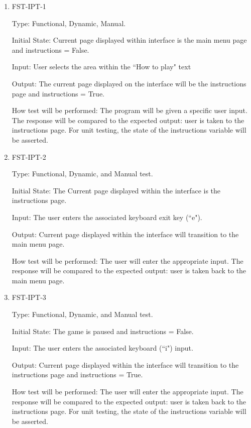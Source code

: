 \documentclass[12pt, titlepage]{article}
\begin{document}
\begin{enumerate}

\item{FST-IPT-1\\}

Type: Functional, Dynamic, Manual.
					
Initial State: Current page displayed within interface is the main menu page and instructions = False.
					
Input: User selects the area within the ``How to play" text
					
Output: The current page displayed on the interface will be the instructions page and instructions = True.
					
How test will be performed: The program will be given a specific user input. The response will be compared to the expected output: user is taken to the instructions page. For unit testing, the state of the instructions variable will be asserted.
					
\item{FST-IPT-2\\}

Type: Functional, Dynamic, and Manual test.
					
Initial State: The Current page displayed within the interface is the instructions page.
					
Input: The user enters the associated keyboard exit key (``e").
					
Output: Current page displayed within the interface will transition to the main menu page.
					
How test will be performed: The user will enter the appropriate input. The response will be compared to the expected output: user is taken back to the main menu page.


\item{FST-IPT-3\\}

Type: Functional, Dynamic, and Manual test.
					
Initial State:  The game is paused and instructions = False.
					
Input: The user enters the associated keyboard (``i") input.
					
Output: Current page displayed within the interface will transition to the instructions page and instructions = True.
					
How test will be performed: The user will enter the appropriate input. The response will be compared to the expected output: user is taken back to the instructions page. For unit testing, the state of the instructions variable will be asserted.




\end{enumerate}
\end{document}
